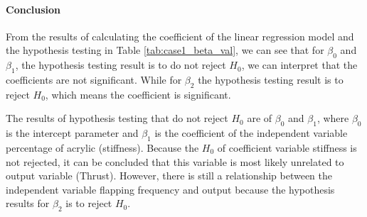 \documentclass[conf]{new-aiaa}
\begin{document}
\paragraph{Conclusion}
From the results of calculating the coefficient of the linear regression model and the hypothesis testing in Table \ref{tab:case1_beta_val}, we can see that for $\beta_0$ and $\beta_1$, the hypothesis testing result is to do not reject $H_0$, we can interpret that the coefficients are not significant. While for $\beta_2$ the hypothesis testing result is to reject $H_0$, which means the coefficient is significant. 

The results of hypothesis testing that do not reject $H_0$ are of $\beta_0$ and $\beta_1$, where $\beta_0$ is the intercept parameter and $\beta_1$ is the coefficient of the independent variable percentage of acrylic (stiffness). Because the $H_0$ of coefficient variable stiffness is not rejected, it can be concluded that this variable is most likely unrelated to output variable (Thrust). However, there is still a relationship between the independent variable flapping frequency and output because the hypothesis results for $\beta_2$ is to reject $H_0$.
\end{document}
